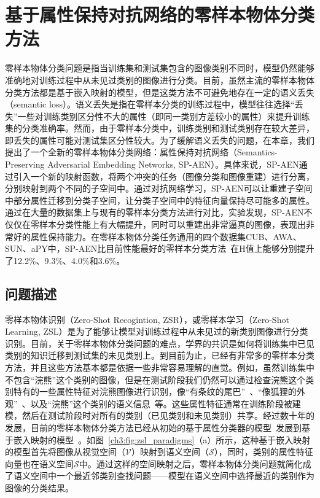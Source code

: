 \chapter{基于属性保持对抗网络的零样本物体分类方法}

零样本物体分类问题是指当训练集和测试集包含的图像类别不同时，模型仍然能够准确地对训练过程中从未见过类别的图像进行分类。目前，虽然主流的零样本物体分类方法都是基于嵌入映射的模型，但是这类方法不可避免地存在一定的语义丢失（semantic loss）。语义丢失是指在零样本分类的训练过程中，模型往往选择“丢失”一些对训练类别区分性不大的属性（即同一类别方差较小的属性）来提升训练集的分类准确率。然而，由于零样本分类中，训练类别和测试类别存在较大差异，即丢失的属性可能对测试集区分性较大。为了缓解语义丢失的问题，在本章，我们提出了一个全新的零样本物体分类网络：属性保持对抗网络（Semantics-Preserving Adversarial Embedding Networks, SP-AEN）。具体来说，SP-AEN通过引入一个新的映射函数，将两个冲突的任务（图像分类和图像重建）进行分离，分别映射到两个不同的子空间中。通过对抗网络学习，SP-AEN可以让重建子空间中部分属性迁移到分类子空间，让分类子空间中的特征向量保持尽可能多的属性。通过在大量的数据集上与现有的零样本分类方法进行对比，实验发现，SP-AEN不仅仅在零样本分类性能上有大幅提升，同时可以重建出非常逼真的图像，表现出非常好的属性保持能力。在零样本物体分类任务通用的四个数据集CUB、AWA、SUN、aPY中，SP-AEN比目前性能最好的零样本分类方法~\cite{xian2017zero}在H值上能够分别提升了12.2\%、9.3\%、4.0\%和3.6\%。


\section{问题描述}

零样本物体识别（Zero-Shot Recogintion, ZSR），或零样本学习（Zero-Shot Learning, ZSL）是为了能够让模型对训练过程中从未见过的新类别图像进行分类识别。目前，关于零样本物体分类问题的难点，学界的共识是如何将训练集中已见类别的知识迁移到测试集的未见类别上。到目前为止，已经有非常多的零样本分类方法，并且这些方法基本都是依据一些非常容易理解的直觉。例如，虽然训练集中不包含“浣熊”这个类别的图像，但是在测试阶段我们仍然可以通过检查浣熊这个类别特有的一些属性特征对浣熊图像进行识别，像“有条纹的尾巴”~\cite{farhadi2009describing,lampert2009learning,zhang2013attribute,li2010object}、“像狐狸的外观”~\cite{torresani2010efficient,li2010object}、以及“浣熊”这个类别的语义信息~\cite{pennington2014glove,mikolov2013distributed}等。这些属性特征通常在训练阶段被建模，然后在测试阶段时对所有的类别（已见类别和未见类别）共享。经过数十年的发展，目前的零样本物体分类方法已经从初始的基于属性分类器的模型~\cite{lampert2009learning}发展到基于嵌入映射的模型~\cite{akata2015label,frome2013devise,weston2010large}。如图~\ref{ch3:fig:zsl_paradigms}（a）所示，这种基于嵌入映射的模型首先将图像从视觉空间（$\mathcal{V}$）映射到语义空间（$\mathcal{S}$），同时，类别的属性特征向量也在语义空间$\mathcal{S}$中。通过这样的空间映射之后，零样本物体分类问题就简化成了语义空间中一个最近邻类别查找问题——模型在语义空间中选择最近的类别作为图像的分类结果。

